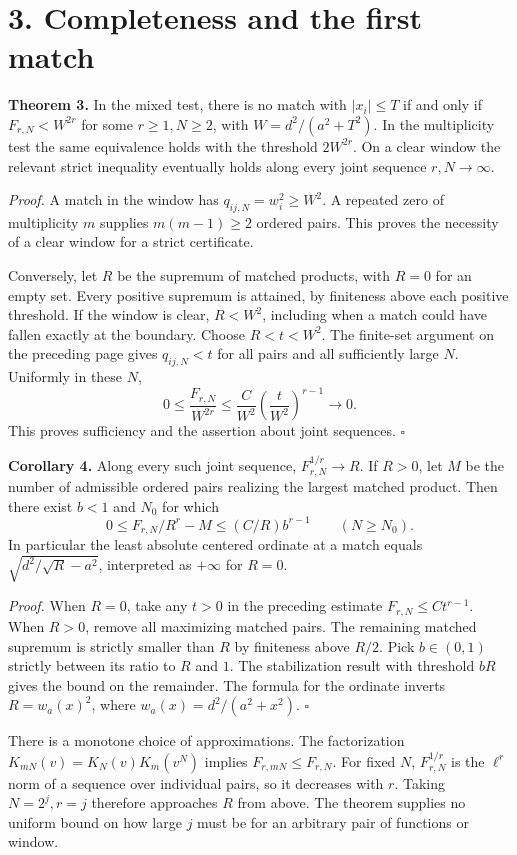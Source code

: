 \documentclass[11pt,letterpaper]{article}
\newcommand{\HH}[1]{\section*{\color{ink}#1}}
\newcommand{\wt}{w_a}
\begin{document}
\newpage
\HH{3. Completeness and the first match}
\textbf{Theorem 3.} In the mixed test, there is no match with $|x_i|\le T$
if and only if $F_{r,N}<W^{2r}$ for some $r\ge1,N\ge2$, with
$W=d^2/(a^2+T^2)$. In the multiplicity test the same equivalence holds
with the threshold $2W^{2r}$. On a clear window the relevant strict
inequality eventually holds along every joint sequence $r,N\to\infty$.

\emph{Proof.} A match in the window has $q_{ij,N}=w_i^2\ge W^2$.
A repeated zero of multiplicity $m$ supplies $m(m-1)\ge2$ ordered pairs.
This proves the necessity of a clear window for a strict certificate.

Conversely, let $R$ be the supremum of matched products, with $R=0$ for an
empty set. Every positive supremum is attained, by finiteness above each
positive threshold. If the window is clear, $R<W^2$, including when a match
could have fallen exactly at the boundary. Choose $R<t<W^2$. The
finite-set argument on the preceding page gives $q_{ij,N}<t$ for all pairs
and all sufficiently large $N$. Uniformly in these $N$,
\[
 0\le \frac{F_{r,N}}{W^{2r}}
 \le \frac{C}{W^2}\left(\frac t{W^2}\right)^{r-1}\longrightarrow0 .
\]
This proves sufficiency and the assertion about joint sequences. \hfill$\square$

\textbf{Corollary 4.} Along every such joint sequence,
$F_{r,N}^{1/r}\to R$. If $R>0$, let $M$ be the number of admissible ordered
pairs realizing the largest matched product. Then there exist $b<1$ and
$N_0$ for which
\[
             0\le F_{r,N}/R^r-M\le (C/R)b^{r-1}\qquad(N\ge N_0).
\]
In particular the least absolute centered ordinate at a match equals
$\sqrt{d^2/\sqrt R-a^2}$, interpreted as $+\infty$ for $R=0$.

\emph{Proof.} When $R=0$, take any $t>0$ in the preceding estimate
$F_{r,N}\le Ct^{r-1}$. When $R>0$, remove all maximizing matched pairs.
The remaining matched supremum is strictly smaller than $R$ by finiteness
above $R/2$. Pick $b\in(0,1)$ strictly between its ratio to $R$ and $1$.
The stabilization result with threshold $bR$ gives the bound on the remainder.
The formula for the ordinate inverts $R=\wt(x)^2$, where
$\wt(x)=d^2/(a^2+x^2)$. \hfill$\square$

There is a monotone choice of approximations. The factorization
$K_{mN}(v)=K_N(v)K_m(v^N)$ implies $F_{r,mN}\le F_{r,N}$.
For fixed $N$, $F_{r,N}^{1/r}$ is the $\ell^r$ norm of a sequence over
individual pairs, so it decreases with $r$. Taking $N=2^j,r=j$ therefore
approaches $R$ from above. The theorem supplies no uniform bound on how
large $j$ must be for an arbitrary pair of functions or window.
\end{document}

